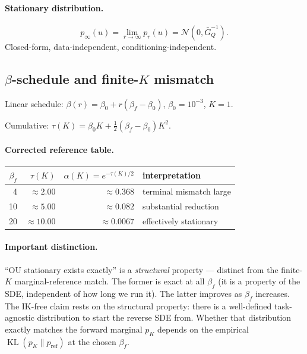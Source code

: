 \documentclass[11pt,a4paper]{article}
\DeclareMathOperator{\KL}{KL}
\newcommand{\N}{\mathcal{N}}
\newcommand{\GQbar}{\bar G_Q}
\begin{document}
\paragraph{Stationary distribution.}
\begin{equation}
p_\infty(u) = \lim_{r \to \infty} p_r(u) = \N(0, \GQbar^{-1}).
\end{equation}
Closed-form, data-independent, conditioning-independent.

\subsection{$\beta$-schedule and finite-$K$ mismatch}
\label{sec:beta-schedule}

Linear schedule: $\beta(r) = \beta_0 + r(\beta_f - \beta_0)$, $\beta_0 = 10^{-3}$, $K = 1$.

Cumulative: $\tau(K) = \beta_0 K + \tfrac{1}{2}(\beta_f - \beta_0) K^2$.

\paragraph{Corrected reference table.}

\begin{center}
\begin{tabular}{r|r|r|l}
$\beta_f$ & $\tau(K)$ & $\alpha(K) = e^{-\tau(K)/2}$ & interpretation \\
\hline
4 & $\approx 2.00$ & $\approx 0.368$ & terminal mismatch large \\
10 & $\approx 5.00$ & $\approx 0.082$ & substantial reduction \\
20 & $\approx 10.00$ & $\approx 0.0067$ & effectively stationary \\
\end{tabular}
\end{center}

\paragraph{Important distinction.} ``OU stationary exists exactly'' is a \emph{structural} property — distinct from the finite-$K$ marginal-reference match. The former is exact at all $\beta_f$ (it is a property of the SDE, independent of how long we run it). The latter improves as $\beta_f$ increases. The IK-free claim rests on the structural property: there is a well-defined task-agnostic distribution to start the reverse SDE from. Whether that distribution exactly matches the forward marginal $p_K$ depends on the empirical $\KL(p_K \| p_\text{ref})$ at the chosen $\beta_f$.
\end{document}
